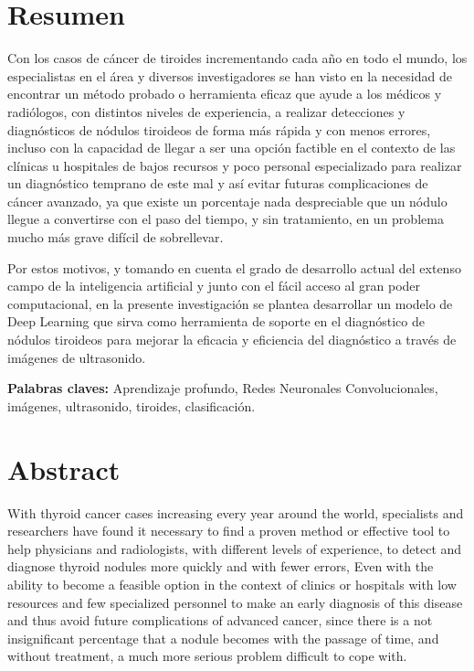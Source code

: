 
\chapter*{Resumen}

Con los casos de cáncer de tiroides incrementando cada año en todo el mundo, los especialistas en el área y diversos investigadores se han visto en la necesidad de encontrar un método probado o herramienta eficaz que ayude a los médicos y radiólogos, con distintos niveles de experiencia, a realizar detecciones y diagnósticos de nódulos tiroideos de forma más rápida y con menos errores, incluso con la capacidad de llegar a ser una opción factible en el contexto de las clínicas u hospitales de bajos recursos y poco personal especializado para realizar un diagnóstico temprano de este mal y así evitar futuras complicaciones de cáncer avanzado, ya que existe un porcentaje nada despreciable que un nódulo llegue a convertirse con el paso del tiempo, y sin tratamiento, en un problema mucho más grave difícil de sobrellevar. 

Por estos motivos, y tomando en cuenta el grado de desarrollo actual del extenso campo de la inteligencia artificial y junto con el fácil acceso al gran poder computacional, en la presente investigación se plantea desarrollar un modelo de Deep Learning que sirva como herramienta de soporte en el diagnóstico de nódulos tiroideos para mejorar la eficacia y eficiencia del diagnóstico a través de imágenes de ultrasonido.
\newline

\textbf{Palabras claves: } Aprendizaje profundo, Redes Neuronales Convolucionales, imágenes, ultrasonido, tiroides, clasificación.

\clearpage
\chapter*{Abstract}
With thyroid cancer cases increasing every year around the world,  specialists and researchers have found it necessary to find a proven method or effective tool to help physicians and radiologists, with different levels of experience, to detect and diagnose thyroid nodules more quickly and with fewer errors, Even with the ability to become a feasible option in the context of clinics or hospitals with low resources and few specialized personnel to make an early diagnosis of this disease and thus avoid future complications of advanced cancer, since there is a not insignificant percentage that a nodule becomes with the passage of time, and without treatment, a much more serious problem difficult to cope with. 

